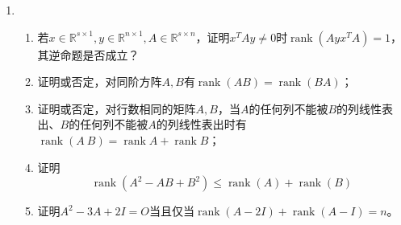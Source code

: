 \documentclass[a4paper,UTF8,fontset=windows]{ctexart}
\DeclareMathOperator{\rank}{rank}
\begin{document}
\begin{enumerate}
    \item
    \begin{enumerate}[(1)]
        \item 若$x\in\mathbb{R}^{s\times1},y\in\mathbb{R}^{n\times1},A\in\mathbb{R}^{s\times n}$，证明$x^TAy\ne0$时$\rank(Ayx^TA)=1$，其逆命题是否成立？
        \item 证明或否定，对同阶方阵$A,B$有$\rank(AB)=\rank(BA)$；
        \item 证明或否定，对行数相同的矩阵$A,B$，当$A$的任何列不能被$B$的列线性表出、$B$的任何列不能被$A$的列线性表出时有$\rank(A\ B)=\rank A+\rank B$；
        \item 证明
        $$\rank(A^2-AB+B^2)\le\rank(A)+\rank(B)$$
        \item 证明$A^2-3A+2I=O$当且仅当$\rank(A-2I)+\rank(A-I)=n$。
    \end{enumerate}
    
\end{enumerate}
\end{document}
